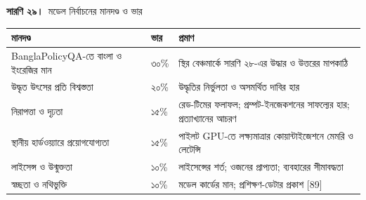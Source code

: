 \documentclass[border=10pt]{standalone}
\begin{document}
\begin{minipage}{17cm}
{\large\bfseries সারণি ২৯।}\ {\large মডেল নির্বাচনের মানদণ্ড ও ভার}\par\vspace{7pt}
\small
{}
\begin{tabularx}{\linewidth}{@{}>{\hsize=1.114\hsize\raggedright\arraybackslash}X>{\hsize=0.343\hsize\raggedright\arraybackslash}X>{\hsize=1.543\hsize\raggedright\arraybackslash}X@{}}
\arrayrulecolor{bapilrule}\toprule
\rowcolor{white}\textbf{মানদণ্ড} & \textbf{ভার} & \textbf{প্রমাণ} \\
\midrule
BanglaPolicyQA-তে বাংলা ও ইংরেজির মান & ৩০\% & স্থির বেঞ্চমার্কে সারণি ২৮-এর উদ্ধার ও উত্তরের মাপকাঠি \\
উদ্ধৃত উৎসের প্রতি বিশ্বস্ততা & ২০\% & উদ্ধৃতির নির্ভুলতা ও অসমর্থিত দাবির হার \\
নিরাপত্তা ও দৃঢ়তা & ১৫\% & রেড-টিমের ফলাফল; প্রম্পট-ইনজেকশনের সাফল্যের হার; প্রত্যাখ্যানের আচরণ \\
স্থানীয় হার্ডওয়্যারে প্রয়োগযোগ্যতা & ১৫\% & পাইলট GPU-তে লক্ষ্যমাত্রার কোয়ান্টাইজেশনে মেমরি ও লেটেন্সি \\
লাইসেন্স ও উন্মুক্ততা & ১০\% & লাইসেন্সের শর্ত; ওজনের প্রাপ্যতা; ব্যবহারের সীমাবদ্ধতা \\
স্বচ্ছতা ও নথিভুক্তি & ১০\% & মডেল কার্ডের মান; প্রশিক্ষণ-ডেটার প্রকাশ [89] \\
\bottomrule
\end{tabularx}
\par\vspace{5pt}{\footnotesize\itshape সারণি ২৮-এর কোনো নিরাপত্তা-সীমা অতিক্রমে ব্যর্থ মডেল মোট স্কোর যা-ই হোক বাদ পড়ে।}
\par{}
\end{minipage}
\end{document}
